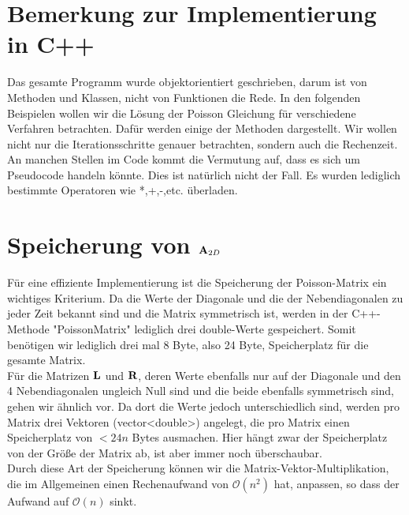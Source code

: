 
\section{Bemerkung zur Implementierung in C++}

Das gesamte Programm wurde objektorientiert geschrieben, darum ist von Methoden und Klassen, nicht von Funktionen die Rede. In den folgenden Beispielen wollen wir die Lösung der Poisson Gleichung für verschiedene Verfahren betrachten. Dafür werden einige der Methoden dargestellt. Wir wollen nicht nur die Iterationsschritte genauer betrachten, sondern auch die Rechenzeit.\\
An manchen Stellen im Code kommt die Vermutung auf, dass es sich um Pseudocode handeln könnte. Dies ist natürlich nicht der Fall. Es wurden lediglich bestimmte Operatoren wie *,+,-,etc. überladen.

\section{Speicherung von ${\textbf{A}}_{2D}$}

Für eine effiziente Implementierung ist die Speicherung der Poisson-Matrix ein wichtiges Kriterium. Da die Werte der Diagonale und die der Nebendiagonalen zu jeder Zeit bekannt sind und die Matrix symmetrisch ist, werden in der C++-Methode "PoissonMatrix"  lediglich drei double-Werte gespeichert. Somit benötigen wir lediglich drei mal 8 Byte, also 24 Byte, Speicherplatz für die gesamte Matrix.\\
Für die Matrizen ${\textbf{L}}$ und ${\textbf{R}}$, deren Werte ebenfalls nur auf der Diagonale und den 4 Nebendiagonalen ungleich Null sind und die beide ebenfalls symmetrisch sind, gehen wir ähnlich vor. Da dort die Werte jedoch unterschiedlich sind, werden pro Matrix drei Vektoren (vector<double>) angelegt, die pro Matrix einen Speicherplatz von  $< 24n$ Bytes ausmachen. Hier hängt zwar der Speicherplatz von der Größe der Matrix ab, ist aber immer noch überschaubar.\\
Durch diese Art der Speicherung können wir die Matrix-Vektor-Multiplikation, die im Allgemeinen einen Rechenaufwand von $\mathcal{O}(n^{2})$ hat, anpassen, so dass der Aufwand auf $\mathcal{O}(n)$ sinkt.

